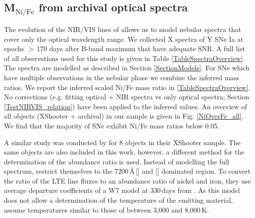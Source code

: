 \documentclass[fleqn,usenatbib]{mnras}
\begin{document}
\subsection{M$_\text{Ni/Fe}$ from archival optical spectra}
The evolution of the NIR/VIS lines of  allows us to model nebular spectra that cover only the optical wavelength range. We collected X spectra of Y SNe Ia at epochs $>\,170$ days after B-band maximum that have adequate SNR. A full list of all observations used for this study is given in Table \ref{TableSpectraOverview}. 
The spectra are modelled as described in Section \ref{SectionModels}. For SNe which have multiple observations in the nebular phase we combine the inferred mass ratios. We report the inferred scaled Ni/Fe mass ratio in \ref{TableSpectraOverview}. No corrections (e.g. fitting optical + NIR spectra vs only optical spectra; Section \ref{TestNIRVIS_relation}) have been applied to the inferred values. An overview of all objects (XShooter + archival) in our sample is given in Fig. \ref{NiOverFe_all}. We find that the majority of SNe exhibit Ni/Fe mass ratios below 0.05.

A similar study was conducted by \citet{2018MNRAS.477.3567M} for 8 objects in their XShooter sample. The same objects are also included in this work, however, a different method for the determination of the abundance ratio is used. Instead of modelling the full spectrum, \citet{2018MNRAS.477.3567M} restrict themselves to the $7200\,$\AA\,[] and [] dominated region. To convert the ratio of the LTE line fluxes to an abundance ratio of nickel and iron, they use average departure coefficients of a W7 model \citep{1984ApJ...286..644N,2018SSRv..214...67N} at 330\,days from \citet{2015ApJ...814L...2F}. As this model does not allow a determination of the temperature of the emitting material, \citet{2018MNRAS.477.3567M} assume temperatures similar to those of \citet{2015ApJ...814L...2F} between 3,000 and 8,000\,K.
\end{document}
